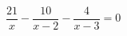 \begin{ex}
	\begin{condition}
		\( \dfrac{21}{x}-\dfrac{10}{x-2}-\dfrac{4}{x-3}=0 \)
	\end{condition}
\end{ex}
